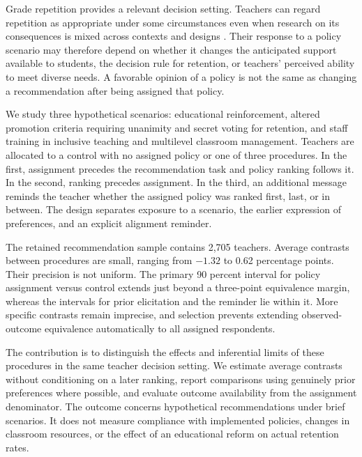 Grade repetition provides a relevant decision setting. Teachers can regard repetition as appropriate under some circumstances even when research on its consequences is mixed across contexts and designs \cite{allen,goos,tomchin}. Their response to a policy scenario may therefore depend on whether it changes the anticipated support available to students, the decision rule for retention, or teachers' perceived ability to meet diverse needs. A favorable opinion of a policy is not the same as changing a recommendation after being assigned that policy.

We study three hypothetical scenarios: educational reinforcement, altered promotion criteria requiring unanimity and secret voting for retention, and staff training in inclusive teaching and multilevel classroom management. Teachers are allocated to a control with no assigned policy or one of three procedures. In the first, assignment precedes the recommendation task and policy ranking follows it. In the second, ranking precedes assignment. In the third, an additional message reminds the teacher whether the assigned policy was ranked first, last, or in between. The design separates exposure to a scenario, the earlier expression of preferences, and an explicit alignment reminder.

The retained recommendation sample contains 2,705 teachers. Average contrasts between procedures are small, ranging from $-1.32$ to 0.62 percentage points. Their precision is not uniform. The primary 90 percent interval for policy assignment versus control extends just beyond a three-point equivalence margin, whereas the intervals for prior elicitation and the reminder lie within it. More specific contrasts remain imprecise, and selection prevents extending observed-outcome equivalence automatically to all assigned respondents.


The contribution is to distinguish the effects and inferential limits of these procedures in the same teacher decision setting. We estimate average contrasts without conditioning on a later ranking, report comparisons using genuinely prior preferences where possible, and evaluate outcome availability from the assignment denominator. The outcome concerns hypothetical recommendations under brief scenarios. It does not measure compliance with implemented policies, changes in classroom resources, or the effect of an educational reform on actual retention rates.

